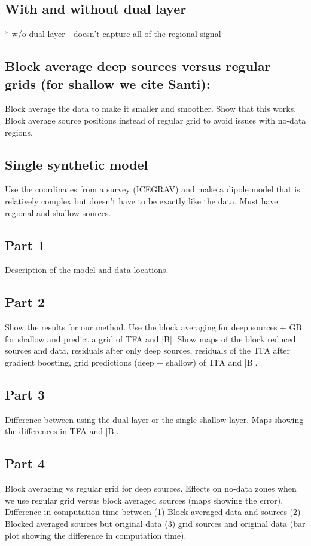 \subsection{With and without dual layer}
* w/o dual layer - doesn't capture all of the regional signal

\subsection{Block average deep sources versus regular grids (for shallow we cite Santi):}
Block average the data to make it smaller and smoother. Show that this works.
Block average source positions instead of regular grid to avoid issues with no-data regions.

\subsection{Single synthetic model}
Use the coordinates from a survey (ICEGRAV) and make a dipole model that is relatively complex but doesn't have to be exactly like the data. Must have regional and shallow sources.


\subsection{Part 1}
Description of the model and data locations.

\subsection{Part 2}
Show the results for our method. Use the block averaging for deep sources + GB for shallow and predict a grid of TFA and |B|. Show maps of the block reduced sources and data, residuals after only deep sources, residuals of the TFA after gradient boosting, grid predictions (deep + shallow) of TFA and |B|.

\subsection{Part 3}
Difference between using the dual-layer or the single shallow layer. Maps showing the differences in TFA and |B|.

\subsection{Part 4}
Block averaging vs regular grid for deep sources. Effects on no-data zones when we use regular grid versus block averaged sources (maps showing the error). Difference in computation time between (1) Block averaged data and sources (2) Blocked averaged sources but original data (3) grid sources and original data (bar plot showing the difference in computation time).

